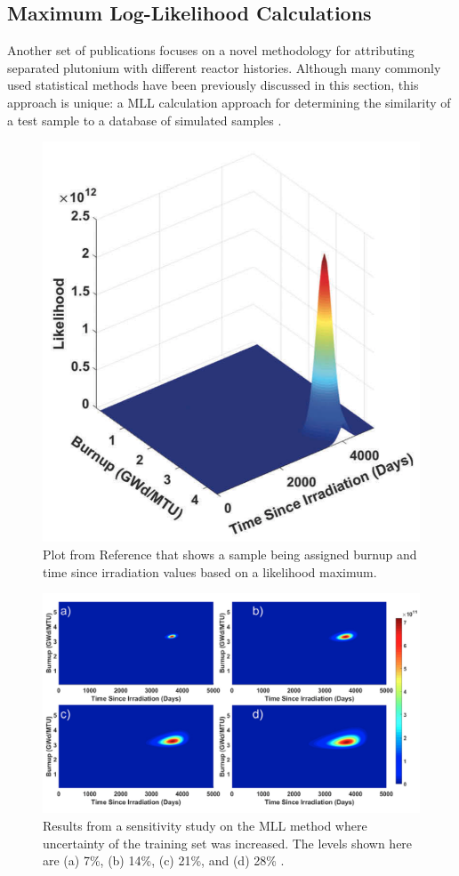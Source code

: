 \subsection{Maximum Log-Likelihood Calculations}

Another set of publications focuses on a novel methodology for attributing
separated plutonium with different reactor histories.  Although many commonly
used statistical methods have been previously discussed in this section, this
approach is unique: a \gls{MLL} calculation approach for determining the
similarity of a test sample to a database of simulated samples
\cite{mll_method}.  

\begin{figure}[!htb]
  \centering
  \includegraphics[width=0.6\linewidth]{./chapters/litrev/tamu.png}
  \caption[Example of likelihood maximum predicting burnup and time since 
           irradiation]
          {Plot from Reference \cite{mll_method} that shows a sample being 
           assigned burnup and time since irradiation values based on a 
           likelihood maximum.}
  \label{fig:tamu}
\end{figure}

\begin{figure}[!htb]
  \centering
  \includegraphics[width=\linewidth]{./chapters/litrev/tamu2.png}
  \caption[Sensitivity of likelihood to training set uncertainty]
          {Results from a sensitivity study on the \gls{MLL} method where 
           uncertainty of the training set was increased. The levels shown 
           here are (a) 7\%, (b) 14\%, (c) 21\%, and (d) 28\% 
           \cite{mll_sensitivity}.}
  \label{fig:tamu2}
\end{figure}

